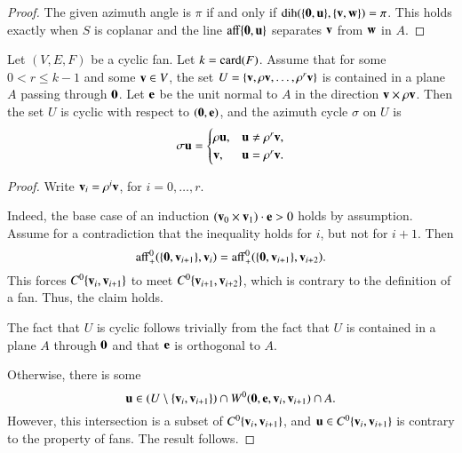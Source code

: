 \begin{proof}  The given azimuth angle is $\pi$ if and only if $\operatorname{dih}(\{{\mathbf 0},{\mathbf u}\},\{{\mathbf v},{\mathbf w}\})=\pi$.  This holds
exactly when $S$ is coplanar and the line ${\operatorname{aff}}\{{\mathbf 0},{\mathbf u}\}$ separates ${\mathbf v}$ from ${\mathbf w}$ in $A$.
\end{proof}

\begin{lemma}\label{lemma:kom}
Let $(V,E,F)$ be a cyclic fan.  Let $k={\operatorname{card}}(F)$.  Assume that for some $0<r\le k-1$ and some ${\mathbf v}\in V$, the set $U=\{{\mathbf v},\rho {\mathbf v},\ldots,\rho^r {\mathbf v}\}$ is contained in a plane $A$ passing through ${\mathbf 0}$.  Let ${\mathbf e}$ be the unit normal to $A$ in the direction ${\mathbf v}\times \rho {\mathbf v}$.  Then 
the set $U$ is cyclic with respect to $({\mathbf 0},{\mathbf e})$, and the azimuth cycle $\sigma$ on $U$ is 
$$
\sigma {\mathbf u} = \begin{cases} \rho {\mathbf u}, & {\mathbf u}\ne \rho^r{\mathbf v},\\ {\mathbf v}, & {\mathbf u} = \rho^r{\mathbf v}.\end{cases}
$$
\end{lemma}

\begin{proof} 
Write ${\mathbf v}_i = \rho^i {\mathbf v}$, for $i=0,\ldots,r$.

Indeed, the base case of an induction  $({\mathbf v}_0\times {\mathbf v}_1)\cdot {\mathbf e} > 0$ holds by assumption.    
Assume for a contradiction that the inequality holds for $i$, but not for $i+1$.
Then 
$${\operatorname{aff}}^0_+(\{{\mathbf 0},{\mathbf v}_{i+1}\},{\mathbf v}_i) = {\operatorname{aff}}^0_+(\{{\mathbf 0},{\mathbf v}_{i+1}\},{\mathbf v}_{i+2}).$$ 
This forces $C^0\{{\mathbf v}_i,{\mathbf v}_{i+1}\}$ to meet $C^0\{{\mathbf v}_{i+1},{\mathbf v}_{i+2}\}$, which
is contrary to the definition of a fan.  Thus, the claim holds.

The fact that $U$ is cyclic follows trivially from the fact that $U$ is contained in a plane $A$ through ${\mathbf 0}$ and that ${\mathbf e}$ is orthogonal to $A$.

Otherwise, there is some 
$${\mathbf u} \in (U\setminus \{{\mathbf v}_i,{\mathbf v}_{i+1}\}) \cap W^0({\mathbf 0},{\mathbf e},{\mathbf v}_i,{\mathbf v}_{i+1}) \cap A.
$$
However, this intersection is a subset of $C^0\{{\mathbf v}_i,{\mathbf v}_{i+1}\}$,
and ${\mathbf u}\in C^0\{{\mathbf v}_i,{\mathbf v}_{i+1}\}$ is contrary to the property  of fans.  The result follows.
\end{proof}

